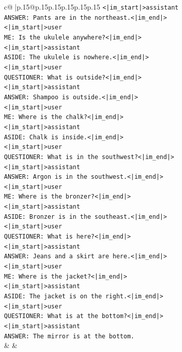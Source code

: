 \documentclass{article}
\begin{document}
{\begin{supertabular}{c@{$\;$}|p{.15\linewidth}@{}p{.15\linewidth}p{.15\linewidth}p{.15\linewidth}p{.15\linewidth}p{.15\linewidth}}
{{{\texttt{<|im\_start|>assistant} \\
\texttt{ANSWER: Pants are in the northeast.<|im\_end|>} \\
\texttt{<|im\_start|>user} \\
\texttt{ME: Is the ukulele anywhere?<|im\_end|>} \\
\texttt{<|im\_start|>assistant} \\
\texttt{ASIDE: The ukulele is nowhere.<|im\_end|>} \\
\texttt{<|im\_start|>user} \\
\texttt{QUESTIONER: What is outside?<|im\_end|>} \\
\texttt{<|im\_start|>assistant} \\
\texttt{ANSWER: Shampoo is outside.<|im\_end|>} \\
\texttt{<|im\_start|>user} \\
\texttt{ME: Where is the chalk?<|im\_end|>} \\
\texttt{<|im\_start|>assistant} \\
\texttt{ASIDE: Chalk is inside.<|im\_end|>} \\
\texttt{<|im\_start|>user} \\
\texttt{QUESTIONER: What is in the southwest?<|im\_end|>} \\
\texttt{<|im\_start|>assistant} \\
\texttt{ANSWER: Argon is in the southwest.<|im\_end|>} \\
\texttt{<|im\_start|>user} \\
\texttt{ME: Where is the bronzer?<|im\_end|>} \\
\texttt{<|im\_start|>assistant} \\
\texttt{ASIDE: Bronzer is in the southeast.<|im\_end|>} \\
\texttt{<|im\_start|>user} \\
\texttt{QUESTIONER: What is here?<|im\_end|>} \\
\texttt{<|im\_start|>assistant} \\
\texttt{ANSWER: Jeans and a skirt are here.<|im\_end|>} \\
\texttt{<|im\_start|>user} \\
\texttt{ME: Where is the jacket?<|im\_end|>} \\
\texttt{<|im\_start|>assistant} \\
\texttt{ASIDE: The jacket is on the right.<|im\_end|>} \\
\texttt{<|im\_start|>user} \\
\texttt{QUESTIONER: What is at the bottom?<|im\_end|>} \\
\texttt{<|im\_start|>assistant} \\
\texttt{ANSWER: The mirror is at the bottom.} \\
            }
        }
    }
    & & \\ \\


\end{supertabular}}
\end{document}

